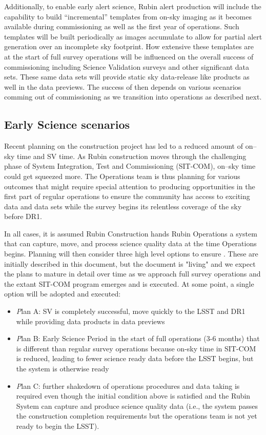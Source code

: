 Additionally, to enable early alert science, Rubin alert production will include the capability to build ``incremental'' templates from on-sky imaging as it becomes available during commissioning as well as the first year of operations. 
Such templates will be built periodically as images accumulate to allow for partial alert generation over an incomplete sky footprint.
How extensive these templates are at the start of full survey operations will be influenced on the overall success of commissioning including Science Validation surveys and other significant data sets. These same data sets will provide static sky data-release like products as well in the data previews. The success of \es then depends on various scenarios comming out of commissioning as we transition into operations as described next.   

\subsection{Early Science scenarios } \label{ssec:scenarios}
Recent planning on the construction project has led to a reduced amount of on--sky time and SV time.
As Rubin construction moves through the challenging phase of System Integration, Test and Commissioning (SIT-COM), on--sky time could get squeezed more. The Operations team is thus planning for various outcomes that might require special attention to producing \es opportunities in the first part of regular operations to ensure the community has access to exciting data and data sets while the survey begins its relentless coverage of the sky before DR1.

In all cases, it is assumed Rubin Construction hands Rubin Operations a system that can capture, move, and process science quality data at the time Operations begins. Planning will then consider three high level options to ensure \es. These are initially described in this document, but the document is "living" and we expect the plans to mature in detail over time as we approach full survey operations and the extant SIT-COM program emerges and is executed. At some point, a single option will be adopted and executed:

\begin{itemize}
\item {\textit Plan A:} SV is completely successful, move quickly to the LSST and DR1 while providing \es data products in data previews
\item {\textit Plan B:} Early Science Period in the start of full operations (3-6 months) that is different than regular survey operations because on-sky time in SIT-COM is reduced, leading to fewer science ready data before the LSST begins, but the system is otherwise ready
\item {\textit Plan C:} further shakedown of operations procedures and data taking is required even though the initial condition above is satisfied and the Rubin System can capture and produce science quality data (i.e., the system passes the construction completion requirements but the operations team is not yet ready to begin the LSST).

\end{itemize}

